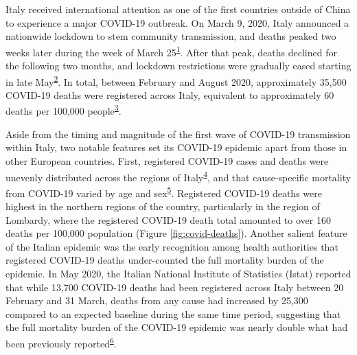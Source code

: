 \documentclass[
]{article}
\begin{document}
Italy received international attention as one of the first countries outside of China to experience a major COVID-19 outbreak. On March 9, 2020, Italy announced a nationwide lockdown to stem community transmission, and deaths peaked two weeks later during the week of March 25\textsuperscript{\protect\hyperlink{ref-Sebastiani2020}{1}}⁠. After that peak, deaths declined for the following two months, and lockdown restrictions were gradually eased starting in late May\textsuperscript{\protect\hyperlink{ref-Alicandro2020}{2}}⁠. In total, between February and August 2020, approximately 35,500 COVID-19 deaths were registered across Italy, equivalent to approximately 60 deaths per 100,000 people\textsuperscript{\protect\hyperlink{ref-InstituteforHealthMetricsandEvaluationIHME2020}{3}}.

Aside from the timing and magnitude of the first wave of COVID-19 transmission within Italy, two notable features set its COVID-19 epidemic apart from those in other European countries. First, registered COVID-19 cases and deaths were unevenly distributed across the regions of Italy\textsuperscript{\protect\hyperlink{ref-LaMaestra2020}{4}}⁠, and that cause-specific mortality from COVID-19 varied by age and sex\textsuperscript{\protect\hyperlink{ref-Albitar2020}{5}}⁠. Registered COVID-19 deaths were highest in the northern regions of the country, particularly in the region of Lombardy, where the registered COVID-19 death total amounted to over 160 deaths per 100,000 population (Figure \ref{fig:covid-deaths}). Another salient feature of the Italian epidemic was the early recognition among health authorities that registered COVID-19 deaths under-counted the full mortality burden of the epidemic. In May 2020, the Italian National Institute of Statistics (Istat) reported that while 13,700 COVID-19 deaths had been registered across Italy between 20 February and 31 March, deaths from any cause had increased by 25,300 compared to an expected baseline during the same time period, suggesting that the full mortality burden of the COVID-19 epidemic was nearly double what had been previously reported\textsuperscript{\protect\hyperlink{ref-Mannucci2020}{6}}.
\end{document}
